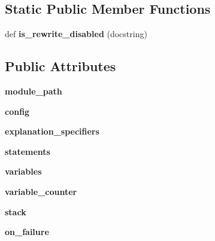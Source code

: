 \subsection*{Static Public Member Functions}
\begin{DoxyCompactItemize}
\item 
\mbox{\label{class__pytest_1_1assertion_1_1rewrite_1_1_assertion_rewriter_a4a0808afd89a25e6e1a9b7c34c04dc43}} 
def {\bfseries is\+\_\+rewrite\+\_\+disabled} (docstring)
\end{DoxyCompactItemize}
\subsection*{Public Attributes}
\begin{DoxyCompactItemize}
\item 
\mbox{\label{class__pytest_1_1assertion_1_1rewrite_1_1_assertion_rewriter_a5b55088c28687afd1de3ef91ae41b381}} 
{\bfseries module\+\_\+path}
\item 
\mbox{\label{class__pytest_1_1assertion_1_1rewrite_1_1_assertion_rewriter_a30a27019505d615bb9bab0a3d7d4ef77}} 
{\bfseries config}
\item 
\mbox{\label{class__pytest_1_1assertion_1_1rewrite_1_1_assertion_rewriter_af6408ae2d94dbdbb81212040e63eafba}} 
{\bfseries explanation\+\_\+specifiers}
\item 
\mbox{\label{class__pytest_1_1assertion_1_1rewrite_1_1_assertion_rewriter_abe60af5d2cb9a504b00688111296b49e}} 
{\bfseries statements}
\item 
\mbox{\label{class__pytest_1_1assertion_1_1rewrite_1_1_assertion_rewriter_af8e1c6173a3094c36f66a7002768fd28}} 
{\bfseries variables}
\item 
\mbox{\label{class__pytest_1_1assertion_1_1rewrite_1_1_assertion_rewriter_a7a6b22d03d00e57ddbaf5df92199d886}} 
{\bfseries variable\+\_\+counter}
\item 
\mbox{\label{class__pytest_1_1assertion_1_1rewrite_1_1_assertion_rewriter_a0c33eaac94202ec17119a17f82e41c47}} 
{\bfseries stack}
\item 
\mbox{\label{class__pytest_1_1assertion_1_1rewrite_1_1_assertion_rewriter_a699e0dd12e73f082c924f1c0a9d5eccc}} 
{\bfseries on\+\_\+failure}
\end{DoxyCompactItemize}
